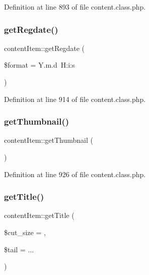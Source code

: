 Definition at line 893 of file content.\+class.\+php.

\hypertarget{classcontentItem_aae303f7b7e5c67302f42f9d9c67b89c2}{}\label{classcontentItem_aae303f7b7e5c67302f42f9d9c67b89c2} 
\subsubsection{\texorpdfstring{get\+Regdate()}{getRegdate()}}
{\footnotesize\ttfamily content\+Item\+::get\+Regdate (\begin{DoxyParamCaption}\item[{}]{\$format = {\ttfamily \textquotesingle{}Y.m.d~H\+:i\+:s\textquotesingle{}} }\end{DoxyParamCaption})}



Definition at line 914 of file content.\+class.\+php.

\hypertarget{classcontentItem_a2d0ac2755de034bee02842e1b4b8179c}{}\label{classcontentItem_a2d0ac2755de034bee02842e1b4b8179c} 
\subsubsection{\texorpdfstring{get\+Thumbnail()}{getThumbnail()}}
{\footnotesize\ttfamily content\+Item\+::get\+Thumbnail (\begin{DoxyParamCaption}{ }\end{DoxyParamCaption})}



Definition at line 926 of file content.\+class.\+php.

\hypertarget{classcontentItem_aa061be1a76a2d94912440572bd4f875a}{}\label{classcontentItem_aa061be1a76a2d94912440572bd4f875a} 
\subsubsection{\texorpdfstring{get\+Title()}{getTitle()}}
{\footnotesize\ttfamily content\+Item\+::get\+Title (\begin{DoxyParamCaption}\item[{}]{\$cut\+\_\+size = {},  }\item[{}]{\$tail = {\ttfamily \textquotesingle{}...\textquotesingle{}} }\end{DoxyParamCaption})}




